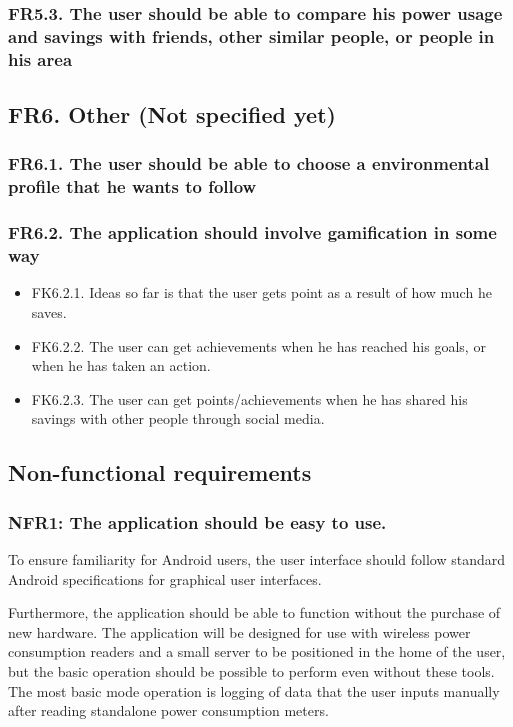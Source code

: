 \subsubsection{FR5.3. The user should be able to compare his power usage and savings with friends, other similar people, or people in his area}

\subsection{FR6. Other (Not specified yet)}
\subsubsection{FR6.1. The user should be able to choose a environmental profile that he wants to follow}
\subsubsection{FR6.2. The application should involve gamification in some way}
\begin{itemize}
\item FK6.2.1. Ideas so far is that the user gets point as a result of how much he saves.
\item FK6.2.2. The user can get achievements when he has reached his goals, or when he has taken an action.
\item FK6.2.3. The user can get points/achievements when he has shared his savings with other people through social media.
\end{itemize}


\subsection{Non-functional requirements}

\subsubsection{NFR1: The application should be easy to use.}
To ensure familiarity for Android users, the user interface should follow standard Android specifications for graphical user interfaces.
 
Furthermore, the application should be able to function without the purchase of new hardware. The application will be designed for use with wireless power consumption readers and a small server to be positioned in the home of the user, but the basic operation should be possible to perform even without these tools. The most basic mode operation is logging of data that 
the user inputs manually after reading standalone power consumption meters.
 
